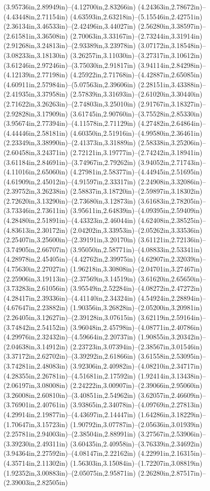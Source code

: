 (3.95736in,2.89949in)--(4.12700in,2.83266in) (4.24363in,2.78672in)--(4.43448in,2.71154in) (4.63593in,2.63218in)--(5.15546in,2.42751in) (2.36134in,3.46533in)--(2.42496in,3.44027in) (2.56280in,3.38597in)--(2.61581in,3.36508in) (2.70063in,3.33167in)--(2.73244in,3.31914in) (2.91268in,3.24813in)--(2.93389in,3.23978in) (3.07172in,3.18548in)--(3.08233in,3.18130in) (3.26257in,3.11030in)--(3.27317in,3.10612in) (3.61246in,2.97246in)--(3.75030in,2.91817in) (3.94114in,2.84298in)--(4.12139in,2.77198in) (4.25922in,2.71768in)--(4.42887in,2.65085in) (4.60911in,2.57984in)--(5.07563in,2.39606in) (2.28151in,3.43388in)--(2.41935in,3.37958in) (2.57839in,3.31693in)--(2.61020in,3.30440in) (2.71622in,3.26263in)--(2.74803in,3.25010in) (2.91767in,3.18327in)--(2.92828in,3.17909in) (3.61745in,2.90760in)--(3.75528in,2.85330in) (3.95674in,2.77394in)--(4.11578in,2.71129in) (4.27482in,2.64864in)--(4.44446in,2.58181in) (4.60350in,2.51916in)--(4.99580in,2.36461in) (2.23349in,3.38990in)--(2.41373in,3.31889in) (2.58338in,3.25206in)--(2.60458in,3.24371in) (2.72121in,3.19777in)--(2.74242in,3.18941in) (3.61184in,2.84691in)--(3.74967in,2.79262in) (3.94052in,2.71743in)--(4.11016in,2.65060in) (4.27981in,2.58377in)--(4.44945in,2.51695in) (4.61909in,2.45012in)--(4.91597in,2.33317in) (2.24908in,3.32086in)--(2.39752in,3.26238in) (2.58837in,3.18720in)--(2.59897in,3.18302in) (2.72620in,3.13290in)--(2.73680in,3.12873in) (3.61683in,2.78205in)--(3.73346in,2.73611in) (3.95611in,2.64839in)--(4.09395in,2.59409in) (4.28480in,2.51891in)--(4.43323in,2.46044in) (4.62408in,2.38525in)--(4.83613in,2.30172in) (2.04202in,3.33953in)--(2.05262in,3.33536in) (2.25407in,3.25600in)--(2.39191in,3.20170in) (3.61121in,2.72136in)--(3.74905in,2.66707in) (3.95050in,2.58771in)--(4.08833in,2.53341in) (4.28978in,2.45405in)--(4.42762in,2.39975in) (4.62907in,2.32039in)--(4.75630in,2.27027in) (1.96218in,3.30808in)--(2.04701in,3.27467in) (2.25906in,3.19113in)--(2.37569in,3.14519in) (3.61620in,2.65650in)--(3.73283in,2.61056in) (3.95549in,2.52284in)--(4.08272in,2.47272in) (4.28417in,2.39336in)--(4.41140in,2.34324in) (4.54924in,2.28894in)--(4.67647in,2.23882in) (1.90356in,3.26828in)--(2.05200in,3.20981in) (2.26405in,3.12627in)--(2.39128in,3.07615in) (3.62119in,2.59164in)--(3.74842in,2.54152in) (3.96048in,2.45798in)--(4.08771in,2.40786in) (4.29976in,2.32432in)--(4.59664in,2.20737in) (1.90855in,3.20342in)--(2.04638in,3.14912in) (2.23723in,3.07394in)--(2.38567in,3.01546in) (3.37172in,2.62702in)--(3.39292in,2.61866in) (3.61558in,2.53095in)--(3.74281in,2.48083in) (3.92306in,2.40982in)--(4.08210in,2.34717in) (4.28355in,2.26781in)--(4.51681in,2.17592in) (1.92414in,3.13438in)--(2.06197in,3.08008in) (2.24222in,3.00907in)--(2.39066in,2.95060in) (3.26008in,2.60810in)--(3.40851in,2.54962in) (3.62057in,2.46609in)--(3.76901in,2.40761in) (3.93865in,2.34078in)--(4.09769in,2.27813in) (4.29914in,2.19877in)--(4.43697in,2.14447in) (1.64286in,3.18229in)--(1.70647in,3.15723in) (1.90792in,3.07787in)--(2.05636in,3.01939in) (2.25781in,2.94003in)--(2.38504in,2.88991in) (3.27567in,2.53906in)--(3.39230in,2.49311in) (3.60435in,2.40958in)--(3.76339in,2.34692in) (3.94364in,2.27592in)--(4.08147in,2.22162in) (4.22991in,2.16315in)--(4.35714in,2.11302in) (1.56303in,3.15084in)--(1.72207in,3.08819in) (1.92352in,3.00883in)--(2.05075in,2.95871in) (2.26280in,2.87517in)--(2.39003in,2.82505in) 